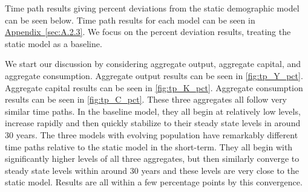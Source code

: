 \documentclass[10pt]{article}
\renewcommand{\thesection}{\arabic{section}}
\renewcommand{\thesubsection}{\thesection.\arabic{subsection}}
\newcommand{\aref}[1]{\hyperref[#1]{Appendix~\ref{#1}}}
\renewcommand{\section}[2][]{\oldsection[#1]{#2}\index{#1}\label{sec:\thesection}}
\renewcommand{\subsection}[2][]{\oldsubsection[#1]{#2}\index{#1}\label{sec:\thesubsection}}
\numberwithin{equation}{subsection}
\begin{document}



\subsection{Time Path}
\par Time path results giving percent deviations from the static demographic model can be seen below. Time path results for each model can be seen in \aref{sec:A.2.3}. We focus on the percent deviation results, treating the static model as a baseline.

\par We start our discussion by considering aggregate output, aggregate capital, and aggregate consumption. Aggregate output results can be seen in \autoref{fig:tp_Y_pct}. Aggregate capital results can be seen in \autoref{fig:tp_K_pct}. Aggregate consumption results can be seen in \autoref{fig:tp_C_pct}. These three aggregates all follow very similar time paths. In the baseline model, they all begin at relatively low levels, increase rapidly and then quickly stabilize to their steady state levels in around 30 years. The three models with evolving population have remarkably different time paths relative to the static model in the short-term. They all begin with significantly higher levels of all three aggregates, but then similarly converge to steady state levels within around 30 years and these levels are very close to the static model. Results are all within a few percentage points by this convergence.
\end{document}

